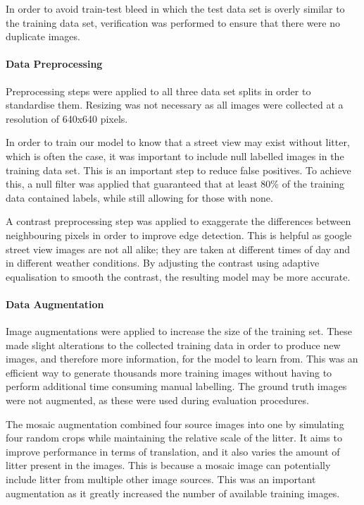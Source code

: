 \documentclass{thesis}
\begin{document}
In order to avoid train-test bleed in which the test data set is overly similar to the training data set, verification was performed to ensure that there were no duplicate images.

\paragraph{Data Preprocessing}

Preprocessing steps were applied to all three data set splits in order to standardise them. Resizing was not necessary as all images were collected at a resolution of 640x640 pixels. 

In order to train our model to know that a street view may exist without litter, which is often the case, it was important to include null labelled images in the training data set. This is an important step to reduce false positives. To achieve this, a null filter was applied that guaranteed that at least 80\% of the training data contained labels, while still allowing for those with none.

A contrast preprocessing step was applied to exaggerate the differences between neighbouring pixels in order to improve edge detection. This is helpful as google street view images are not all alike; they are taken at different times of day and in different weather conditions. By adjusting the contrast using adaptive equalisation to smooth the contrast, the resulting model may be more accurate.

\paragraph{Data Augmentation}

Image augmentations were applied to increase the size of the training set. These made slight alterations to the collected training data in order to produce new images, and therefore more information, for the model to learn from. This was an efficient way to generate thousands more training images without having to perform additional time consuming manual labelling. The ground truth images were not augmented, as these were used during evaluation procedures.

The mosaic augmentation combined four source images into one by simulating four random crops while maintaining the relative scale of the litter. It aims to improve performance in terms of translation, and it also varies the amount of litter present in the images. This is because a mosaic image can potentially include litter from multiple other image sources. This was an important augmentation as it greatly increased the number of available training images.
\end{document}
